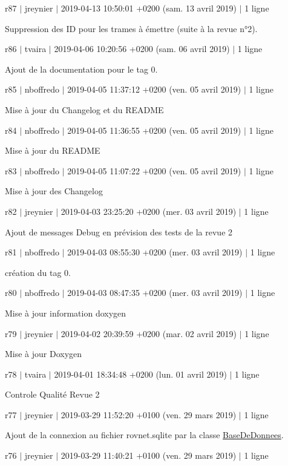 r87 $\vert$ jreynier $\vert$ 2019-\/04-\/13 10\+:50\+:01 +0200 (sam. 13 avril 2019) $\vert$ 1 ligne

Suppression des ID pour les trames à émettre (suite à la revue n°2).

r86 $\vert$ tvaira $\vert$ 2019-\/04-\/06 10\+:20\+:56 +0200 (sam. 06 avril 2019) $\vert$ 1 ligne

Ajout de la documentation pour le tag 0.

r85 $\vert$ nboffredo $\vert$ 2019-\/04-\/05 11\+:37\+:12 +0200 (ven. 05 avril 2019) $\vert$ 1 ligne

Mise à jour du Changelog et du R\+E\+A\+D\+ME

r84 $\vert$ nboffredo $\vert$ 2019-\/04-\/05 11\+:36\+:55 +0200 (ven. 05 avril 2019) $\vert$ 1 ligne

Mise à jour du R\+E\+A\+D\+ME

r83 $\vert$ nboffredo $\vert$ 2019-\/04-\/05 11\+:07\+:22 +0200 (ven. 05 avril 2019) $\vert$ 1 ligne

Mise à jour des Changelog

r82 $\vert$ jreynier $\vert$ 2019-\/04-\/03 23\+:25\+:20 +0200 (mer. 03 avril 2019) $\vert$ 1 ligne

Ajout de messages Debug en prévision des tests de la revue 2

r81 $\vert$ nboffredo $\vert$ 2019-\/04-\/03 08\+:55\+:30 +0200 (mer. 03 avril 2019) $\vert$ 1 ligne

création du tag 0.

r80 $\vert$ nboffredo $\vert$ 2019-\/04-\/03 08\+:47\+:35 +0200 (mer. 03 avril 2019) $\vert$ 1 ligne

Mise à jour information doxygen

r79 $\vert$ jreynier $\vert$ 2019-\/04-\/02 20\+:39\+:59 +0200 (mar. 02 avril 2019) $\vert$ 1 ligne

Mise à jour Doxygen

r78 $\vert$ tvaira $\vert$ 2019-\/04-\/01 18\+:34\+:48 +0200 (lun. 01 avril 2019) $\vert$ 1 ligne

Controle Qualité Revue 2

r77 $\vert$ jreynier $\vert$ 2019-\/03-\/29 11\+:52\+:20 +0100 (ven. 29 mars 2019) $\vert$ 1 ligne

Ajout de la connexion au fichier rovnet.\+sqlite par la classe \hyperlink{class_base_de_donnees}{Base\+De\+Donnees}.

r76 $\vert$ jreynier $\vert$ 2019-\/03-\/29 11\+:40\+:21 +0100 (ven. 29 mars 2019) $\vert$ 1 ligne

